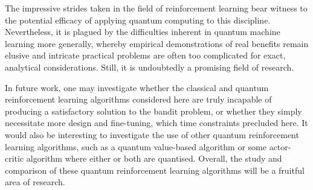 The impressive strides taken in the field of reinforcement learning bear witness to the potential efficacy of applying quantum computing to this discipline.
Nevertheless, it is plagued by the difficulties inherent in quantum machine learning more generally, whereby empirical demonstrations of real benefits remain elusive and intricate practical problems are often too complicated for exact, analytical considerations.
Still, it is undoubtedly a promising field of research.

In future work, one may investigate whether the classical and quantum reinforcement learning algorithms considered here are truly incapable of producing a satisfactory solution to the bandit problem, or whether they simply necessitate more design and fine-tuning, which time constraints precluded here.
It would also be interesting to investigate the use of other quantum reinforcement learning algorithms, such as a quantum value-based algorithm or some actor-critic algorithm where either or both are quantised.
Overall, the study and comparison of these quantum reinforcement learning algorithms will be a fruitful area of research.
